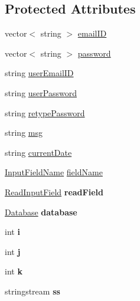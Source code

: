 \subsection*{Protected Attributes}
\begin{DoxyCompactItemize}
\item 
vector$<$ string $>$ \hyperlink{classLogin_a3470a140651dd1afafe29f4dde99905d}{email\-I\-D}
\item 
vector$<$ string $>$ \hyperlink{classLogin_ac097ff5d4f32b36b3f57e8e75fcf18a7}{password}
\item 
string \hyperlink{classLogin_aa83b4706e0f0f0afc65f210ee8e4839a}{user\-Email\-I\-D}
\item 
string \hyperlink{classLogin_a9731be126468f535f161f045c95687c6}{user\-Password}
\item 
string \hyperlink{classLogin_ade36f8943aafce470ef4b8353c79b2c6}{retype\-Password}
\item 
string \hyperlink{classLogin_a82a917399c1459896447984f576230bb}{msg}
\item 
string \hyperlink{classLogin_aac5f21425f8c63a2f40be84079c475a4}{current\-Date}
\item 
\hyperlink{classInputFieldName}{Input\-Field\-Name} \hyperlink{classInputDetail_ac6f85380c5152c406d483726382c4798}{field\-Name}
\item 
\hypertarget{classInputDetail_ac0cc70b017ef94fb55acb46fc44f0df5}{\hyperlink{classReadInputField}{Read\-Input\-Field} {\bfseries read\-Field}}\label{classInputDetail_ac0cc70b017ef94fb55acb46fc44f0df5}

\item 
\hypertarget{classInputDetail_a479cd6c13833bd5de6e5630078c961b6}{\hyperlink{classDatabase}{Database} {\bfseries database}}\label{classInputDetail_a479cd6c13833bd5de6e5630078c961b6}

\item 
\hypertarget{classInputDetail_a2e9226db1b744de4bf406398f48cf962}{int {\bfseries i}}\label{classInputDetail_a2e9226db1b744de4bf406398f48cf962}

\item 
\hypertarget{classInputDetail_af124a26cb4e4f86d0d9eb68200ee500b}{int {\bfseries j}}\label{classInputDetail_af124a26cb4e4f86d0d9eb68200ee500b}

\item 
\hypertarget{classInputDetail_a1bb6b8bff3d5fc6d5c998e4c451035bc}{int {\bfseries k}}\label{classInputDetail_a1bb6b8bff3d5fc6d5c998e4c451035bc}

\item 
\hypertarget{classInputDetail_a5284736b5fd3db0251cfeab7c581c0bd}{stringstream {\bfseries ss}}\label{classInputDetail_a5284736b5fd3db0251cfeab7c581c0bd}


\end{DoxyCompactItemize}
